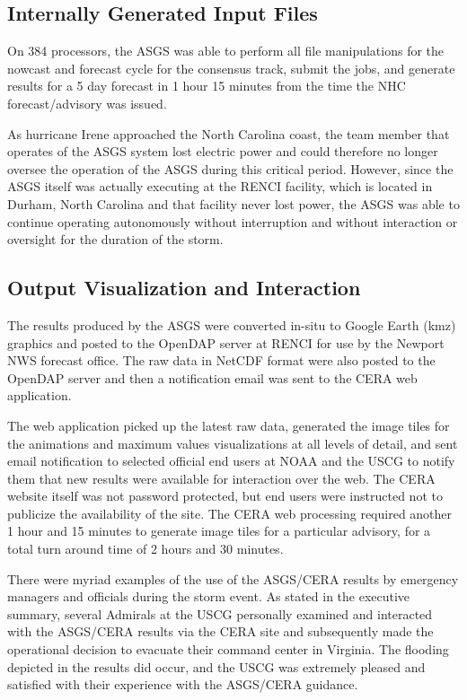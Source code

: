 \documentclass[12pt]{article}
\begin{document}
\subsection{Internally Generated Input Files}

On 384 processors, the ASGS was able to perform all file 
manipulations for the nowcast and forecast cycle for the consensus 
track, submit the jobs, and generate results for a 5 day forecast in 
1 hour 15 minutes from the time the NHC forecast/advisory was issued. 

As hurricane Irene approached the North Carolina coast, the team 
member that operates of the ASGS system lost electric power and 
could therefore no longer oversee the operation of the ASGS during 
this critical period. However, since the ASGS itself was actually 
executing at the RENCI facility, which is located in Durham, North 
Carolina and that facility never lost power, the ASGS was able to 
continue operating autonomously without interruption and without 
interaction or oversight for the duration of the storm.  

\subsection{Output Visualization and Interaction}

The results produced by the ASGS were converted in-situ to Google 
Earth (kmz) graphics and posted to the OpenDAP server at RENCI for 
use by the Newport NWS forecast office. The raw data in NetCDF 
format were also posted to the OpenDAP server and then a 
notification email was sent to the CERA web application. 

The web application picked up the latest raw data, generated the 
image tiles for the animations and maximum values visualizations at 
all levels of detail, and sent email notification to selected 
official end users at NOAA and the USCG to notify them that new 
results were available for interaction over the web. The CERA 
website itself was not password protected, but end users were 
instructed not to publicize the availability of the site. The CERA 
web processing required another 1 hour and 15 minutes to generate 
image tiles for a particular advisory, for a total turn around time 
of 2 hours and 30 minutes.

There were myriad examples of the use of the ASGS/CERA results by 
emergency managers and officials during the storm event. As stated 
in the executive summary, several Admirals at the USCG personally 
examined and interacted with the ASGS/CERA results via the CERA site 
and subsequently made the operational decision to evacuate their 
command center in Virginia. The flooding depicted in the results did 
occur, and the USCG was extremely pleased and satisfied with their 
experience with the ASGS/CERA guidance.
\end{document}
